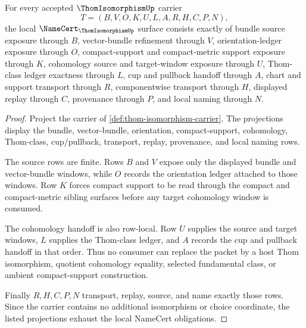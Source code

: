 \begin{theorem}
\label{thm:thom-isomorphism-namecert-obligations}
For every accepted $\ThomIsomorphismUp$ carrier
$$
T=(B,V,O,K,U,L,A,R,H,C,P,N),
$$
the local $\NameCert_{\ThomIsomorphismUp}$ surface consists exactly of bundle source exposure through $B$, vector-bundle refinement through $V$, orientation-ledger exposure through $O$, compact-support and compact-metric support exposure through $K$, cohomology source and target-window exposure through $U$, Thom-class ledger exactness through $L$, cup and pullback handoff through $A$, chart and support transport through $R$, componentwise transport through $H$, displayed replay through $C$, provenance through $P$, and local naming through $N$.
\end{theorem}
\begin{proof}
Project the carrier of \autoref{def:thom-isomorphism-carrier}. The projections display the bundle, vector-bundle, orientation, compact-support, cohomology, Thom-class, cup/pullback, transport, replay, provenance, and local naming rows.

The source rows are finite. Rows $B$ and $V$ expose only the displayed bundle and vector-bundle windows, while $O$ records the orientation ledger attached to those windows. Row $K$ forces compact support to be read through the compact and compact-metric sibling surfaces before any target cohomology window is consumed.

The cohomology handoff is also row-local. Row $U$ supplies the source and target windows, $L$ supplies the Thom-class ledger, and $A$ records the cup and pullback handoff in that order. Thus no consumer can replace the packet by a host Thom isomorphism, quotient cohomology equality, selected fundamental class, or ambient compact-support construction.

Finally $R,H,C,P,N$ transport, replay, source, and name exactly those rows. Since the carrier contains no additional isomorphism or choice coordinate, the listed projections exhaust the local NameCert obligations.
\end{proof}


